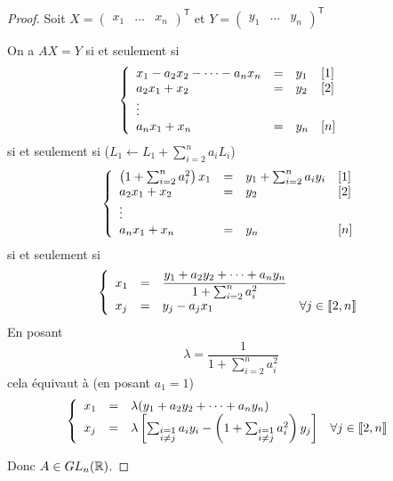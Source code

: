 \documentclass[12pt]{article}
\begin{document}
\begin{proof}
    Soit $X=\begin{pmatrix}
        x_{1} &\dots&x_{n}
    \end{pmatrix}^{\mathsf{T}}$ et $Y=\begin{pmatrix}
        y_{1}&\dots& y_{n}
    \end{pmatrix}^{\mathsf{T}}$

    On a $AX=Y$ si et seulement si 
    \begin{equation}
        \left\lbrace
        \begin{array}[]{lcll}
            x_{1}-a_{2}x_{2}-\dots- a_{n}x_{n} &= &y_{1} &[1]\\
            a_{2}x_{1}+x_{2} &= &y_{2} &[2]\\
            \vdots\\
            a_{n}x_{1}+x_{n}&=&y_{n}&[n]
        \end{array}
        \right.
    \end{equation}
    si et seulement si ($L_{1}\leftarrow L_{1}+\sum_{i=2}^{n}a_{i}L_{i}$)
    \begin{equation}
        \left\lbrace
        \begin{array}[]{lcll}
            \left(1+\sum_{i=2}^{n}a_{i}^{2}\right)x_{1} &= &y_{1}+\sum_{i=2}^{n}a_{i}y_{i} &[1]\\
            a_{2}x_{1}+x_{2} &= &y_{2} &[2]\\
            \vdots\\
            a_{n}x_{1}+x_{n}&=&y_{n}&[n]
        \end{array}
        \right.
    \end{equation}
    si et seulement si 
    \begin{equation}
        \left\lbrace
        \begin{array}[]{lcll}
            x_{1} &= &\dfrac{y_{1}+a_{2}y_{2}+\dots+a_{n}y_{n}}{1+\sum_{i=2}^{n}a_{i}^{2}}\\
            x_{j}&=&y_{j}-a_{j}x_{1} &\forall j\in\llbracket2,n\rrbracket
        \end{array}
        \right.
    \end{equation}
    En posant 
    \begin{equation}
        \lambda=\frac{1}{1+\sum_{i=2}^{n}a_{i}^{2}}
    \end{equation}
    cela équivaut à (en posant $a_{1}=1$)
    \begin{equation}
        \left\lbrace
        \begin{array}[]{lcll}
            x_{1} &= &\lambda(y_{1}+a_{2}y_{2}+\dots+a_{n}y_{n})\\
            x_{j}&=&\lambda\left[\sum_{\substack{i=1\\i\neq j}}a_{i}y_{i}-\left(1+\sum_{\substack{i=1\\i\neq j}}a_{i}^{2}\right)y_{j}\right] &\forall j\in\llbracket2,n\rrbracket
        \end{array}
        \right.
    \end{equation}

    Donc $A\in GL_{n}(\mathbb{R})$.
\end{proof}
\end{document}
